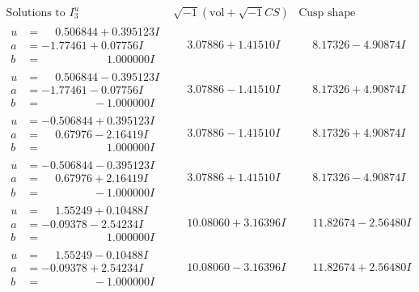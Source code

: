 \documentclass[1p]{elsarticle_modified}
\theoremstyle{definition}
\newcommand{\I}{\sqrt{-1}}
\begin{document}
$$\begin{array}{c|c|c}  
\text{Solutions to }I^u_{3}& \I (\text{vol} + \sqrt{-1}CS) & \text{Cusp shape}\\
 \hline 
\begin{aligned}
u &= \phantom{-}0.506844 + 0.395123 I \\
a &= -1.77461 + 0.07756 I \\
b &= \phantom{-0.000000 -}1.000000 I\end{aligned}
 & \phantom{-}3.07886 + 1.41510 I & \phantom{-}8.17326 - 4.90874 I \\ \hline\begin{aligned}
u &= \phantom{-}0.506844 - 0.395123 I \\
a &= -1.77461 - 0.07756 I \\
b &= \phantom{-0.000000 } -1.000000 I\end{aligned}
 & \phantom{-}3.07886 - 1.41510 I & \phantom{-}8.17326 + 4.90874 I \\ \hline\begin{aligned}
u &= -0.506844 + 0.395123 I \\
a &= \phantom{-}0.67976 - 2.16419 I \\
b &= \phantom{-0.000000 -}1.000000 I\end{aligned}
 & \phantom{-}3.07886 - 1.41510 I & \phantom{-}8.17326 + 4.90874 I \\ \hline\begin{aligned}
u &= -0.506844 - 0.395123 I \\
a &= \phantom{-}0.67976 + 2.16419 I \\
b &= \phantom{-0.000000 } -1.000000 I\end{aligned}
 & \phantom{-}3.07886 + 1.41510 I & \phantom{-}8.17326 - 4.90874 I \\ \hline\begin{aligned}
u &= \phantom{-}1.55249 + 0.10488 I \\
a &= -0.09378 - 2.54234 I \\
b &= \phantom{-0.000000 -}1.000000 I\end{aligned}
 & \phantom{-}10.08060 + 3.16396 I & \phantom{-}11.82674 - 2.56480 I \\ \hline\begin{aligned}
u &= \phantom{-}1.55249 - 0.10488 I \\
a &= -0.09378 + 2.54234 I \\
b &= \phantom{-0.000000 } -1.000000 I\end{aligned}
 & \phantom{-}10.08060 - 3.16396 I & \phantom{-}11.82674 + 2.56480 I \\ \hline\begin{aligned}

\end{aligned}
\end{array}$$
\end{document}
